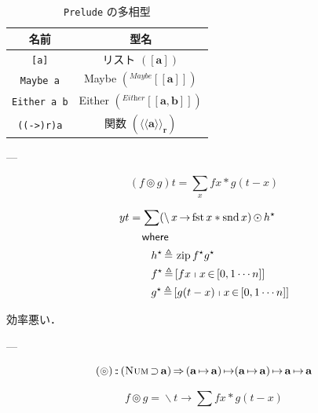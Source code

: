 \documentclass[a5paper,twoside,fleqn]{jsbook}
\def\[{\left[\!\left[}
\def\]{\right]\!\right]}
\newcommand{\Langle}{\langle\!\langle}
\newcommand{\Rangle}{\rangle\!\rangle}
\newcommand{\code}[1]{\texttt{#1}}
\newcommand{\filename}[1]{\texttt{#1}}
\newcommand{\mKeyword}[1]{\mathsf{#1}} %
\newcommand{\mWhereKeyword}{\mKeyword{where}}
\DeclareMathOperator{\mSuperClass}{\Rightarrow}
\DeclareMathOperator{\mSuperSet}{\supset}
\DeclareMathOperator{\mWhere}{\mWhereKeyword}
\newcommand{\mSpecialFunc}[1]{\mathrm{#1}}
\DeclareMathOperator{\mFirst}{\mSpecialFunc{fst}}
\DeclareMathOperator{\mSecond}{\mSpecialFunc{snd}}
\DeclareMathOperator{\mZipFunc}{\mSpecialFunc{zip}}
\DeclareMathOperator{\mFrom}{\in}
\DeclareMathOperator{\mIn}{{:\!:}}
\DeclareMathOperator{\mLambda}{\backslash}
\DeclareMathOperator{\mLambdaArrow}{\rightarrow}
\DeclareMathOperator{\mLetEq}{\triangleq}
\DeclareMathOperator{\mMapList}{\odot}
\DeclareMathOperator{\mMapsTo}{\mapsto}
\newcommand{\mType}[1]{\mathbf{#1}}
\newcommand{\mFuncType}[2]{\Langle\mType{#1}\Rangle_\mType{#2}}
\newcommand{\mListType}[1]{[\mType{#1}]}
\newcommand{\mGenericTypeAssemble}[2]{{}^{\mTypeConstructor{#1}}\[\mType{#2}\]}
\newcommand{\mGenericTypeAssembleII}[3]{{}^{\mTypeConstructor{#1}}\[\mType{#2},\mType{#3}\]}
\newcommand{\mEitherType}[2]{\mGenericTypeAssembleII{Either}{#1}{#2}}
\newcommand{\mMaybeType}[1]{\mGenericTypeAssemble{Maybe}{#1}}
\newcommand{\mTypeConstructor}[1]{\textit{#1}}
\newcommand{\mListWith}[1]{\left[#1\right]}
\newcommand{\mGenericTypeClass}[1]{\textsc{#1}} %
\newcommand{\mNumTypeClass}{\mGenericTypeClass{Num}}
\newcommand{\mList}[1]{{#1}^\mathrm{\star}}
\newcommand{\mListComp}[1]{\shortmid#1}
\newcommand{\mLambdaExp}[2]{\mLambda{#1}\mLambdaArrow{#2}}
\newcommand{\mProj}[2]{#1\mMapsTo#2}
\begin{document}
\begin{table}
\caption{\filename{Prelude} の多相型}
\label{tab:data-types-polymorphic}
\begin{center}
\begin{tabular}{||c|c||}
\hline
名前&型名\\
\hline\hline
\code{[a]}&リスト $(\mListType{a})$\\
\code{Maybe a}&Maybe $\left(\mMaybeType{a}\right)$\\
\code{Either a b}&Either $\left(\mEitherType{a}{b}\right)$\\
\code{((->)r)a}&関数 $\left(\mFuncType{a}{r}\right)$\\
\hline
\end{tabular}
\end{center}
\end{table}


---

\begin{equation}
(f\circledcirc g)t=\sum_xfx*g(t-x)
\end{equation}

\begin{equation}
\begin{aligned}
yt&=\sum(\mLambdaExp{x}{\mFirst x*\mSecond x})\mMapList\mList{h}\\
&\quad\mWhere\\
&\qquad\mList{h}\mLetEq{}\mZipFunc\mList{f}\mList{g}\\
&\qquad\mList{f}\mLetEq\mListWith{fx\mListComp x\mFrom\mListWith{0,1\dotsb n}}\\
&\qquad\mList{g}\mLetEq\mListWith{g(t-x)\mListComp x\mFrom\mListWith{0,1\dotsb n}}
\end{aligned}
\end{equation}

効率悪い．

---

\begin{equation}
(\circledcirc)\mIn{}(\mNumTypeClass\mSuperSet\mType{a})\mSuperClass{}
\mProj{
  (\mProj{\mType{a}}{\mType{a}})
}
{
  \mProj{(\mProj{\mType{a}}{\mType{a}})}
  {\mProj{\mType{a}}{\mType{a}}}
}
\end{equation}

\begin{equation}
f\circledcirc g=\mLambdaExp{t}{\sum fx*g(t-x)}
\end{equation}
\end{document}

